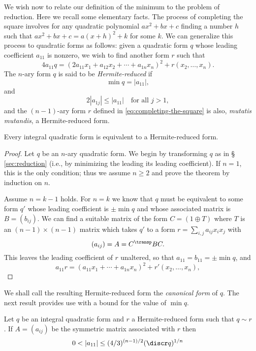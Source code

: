 We wish now to relate our definition of the minimum to the problem of reduction. Here we recall some elementary facts. The process of completing the square involves for any quadratic polynomial \(ax^2 + bx + c\) finding a number \(h\) such that \(ax^2 + bx + c = a(x + h)^2 + k\) for some \(k\). We can generalize this process to quadratic forms as follows: given a quadratic form \(q\) whose leading coefficient \(a_{11}\) is nonzero, we wish to find another form \(r\) such that
\begin{equation}
  \label{eq:completing-the-square}
  4a_{11}q = (2a_{11}x_1 + a_{12}x_2 + \cdots + a_{1n}x_n)^2 + r(x_2, \dots, x_n).
\end{equation}
The \(n\)-ary form \(q\) is said to be \emph{Hermite-reduced} if
\[
  \min q = |a_{11}|,
\]
and
\[
  2|a_{1j}| \leq |a_{11}| \quad \text{for all } j > 1,
\]
and the \((n-1)\)-ary form \(r\) defined in \eqref{eq:completing-the-square} is also, \emph{mutatis mutandis}, a Hermite-reduced form.

\begin{theoremx}
  {\normalfont \cite[p.~18ff]{watson1960integral}}
  Every integral quadratic form is equivalent to a Hermite-reduced form.
\end{theoremx}

\begin{proof}
  Let \(q\) be an \(n\)-ary quadratic form. We begin by transforming \(q\) as in \S\,\ref{sec:reduction} (i.e., by minimizing the leading its leading coefficient). If \(n = 1\), this is the only condition; thus we assume \(n \geq 2\) and prove the theorem by induction on \(n\).

  Assume \(n = k - 1\) holds. For \(n = k\) we know that \(q\) must be equivalent to some form \(q'\) whose leading coefficient is \(\pm \min q\) and whose associated matrix is \(B = (b_{ij})\). We can find a suitable matrix of the form \(C = (1 \oplus T)\) where \(T\) is an \((n - 1) \times (n-1)\) matrix which takes \(q'\) to a form \(r = \sum_{i,j} a_{ij} x_i x_j\) with
  \[(a_{ij}) = A = C^{\transp}BC.\]
  This leaves the leading coefficient of \(r\) unaltered, so that \(a_{11} = b_{11} = \pm \min q\), and
  \[
    a_{11}r = (a_{11}x_1 + \cdots + a_{1n}x_n)^2 + r'(x_2, \dots, x_n),
  \]
\end{proof}

We shall call the resulting Hermite-reduced form the \emph{canonical form} of \(q\). The next result provides use with a bound for the value of \(\min q\).

\begin{theoremx}
  {\normalfont \cite[p.~59ff]{jones1950arithmetic}}
  Let \(q\) be an integral quadratic form and \(r\) a Hermite-reduced form such that \(q \sim r\). If \(A = (a_{ij})\) be the symmetric matrix associated with \(r\) then
  \[
    0 < |a_{11}| \leq (4/3)^{(n-1)/2} ({\discr q})^{1/n}
  \]
\end{theoremx}

